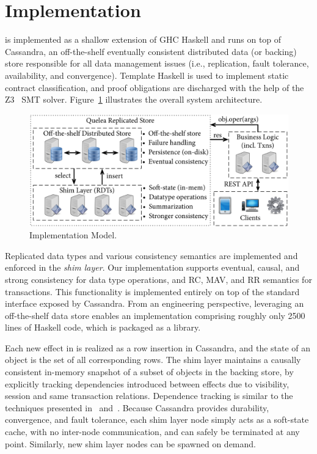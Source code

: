 \section{Implementation}
\label{sec:impl}

\name is implemented as a shallow extension of GHC Haskell and runs on top of
Cassandra, an off-the-shelf eventually consistent distributed data (or backing)
store responsible for all data management issues (i.e., replication, fault
tolerance, availability, and convergence).  Template Haskell is used to
implement static contract classification, and proof obligations are discharged
with the help of the Z3~\cite{Z3} SMT solver. Figure~\ref{fig:impl_mod}
illustrates the overall system architecture.

\begin{figure}
\begin{center}
\includegraphics[width=\columnwidth]{Figures/ImplModel}
\end{center}
\caption{Implementation Model.}
\label{fig:impl_mod}
\end{figure}

Replicated data types and various consistency semantics are implemented and
enforced in the \emph{shim layer}. Our implementation supports eventual,
causal, and strong consistency for data type operations, and RC, MAV, and RR
semantics for transactions.  This functionality is implemented entirely on
top of the standard interface exposed by Cassandra. From an engineering
perspective, leveraging an off-the-shelf data store enables an
implementation comprising roughly only 2500 lines of Haskell code, which is
packaged as a library.

Each new effect in \name is realized as a row insertion in Cassandra, and
the state of an object is the set of all corresponding rows. The shim layer
maintains a causally consistent in-memory snapshot of a subset of objects in
the backing store, by explicitly tracking dependencies introduced between
effects due to visibility, session and same transaction
relations. Dependence tracking is similar to the techniques presented
in~\cite{BoltOn} and~\cite{Eiger}. Because Cassandra provides durability,
convergence, and fault tolerance, each shim layer node simply acts as a
soft-state cache, with no inter-node communication, and can safely be
terminated at any point. Similarly, new shim layer nodes can be spawned on
demand.

